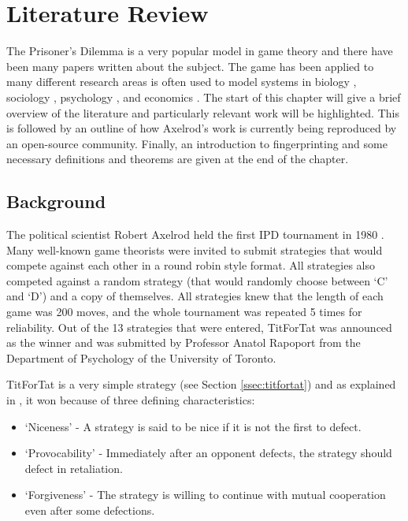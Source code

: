
\chapter{Literature Review}\label{cha:literature_review}

The Prisoner's Dilemma is a very popular model in game theory and there have been many papers written about the subject.
The game has been applied to many different research areas is often used to model systems in biology \cite{Sigmund1999}, sociology \cite{Franken2005}, psychology \cite{Ishibuchi2005}, and economics \cite{Chong2005}.
The start of this chapter will give a brief overview of the literature and particularly relevant work will be highlighted.
This is followed by an outline of how Axelrod's work is currently being reproduced by an open-source community.
Finally, an introduction to fingerprinting and some necessary definitions and theorems are given at the end of the chapter.


\section{Background}\label{sec:axelrodoriginal}

The political scientist Robert Axelrod held the first IPD tournament in 1980 \cite{Axelrod1980a}.
Many well-known game theorists were invited to submit strategies that would compete against each other in a round robin style format.
All strategies also competed against a random strategy (that would randomly choose between `C' and `D') and a copy of themselves.
All strategies knew that the length of each game was 200 moves, and the whole tournament was repeated 5 times for reliability.
Out of the 13 strategies that were entered, TitForTat was announced as the winner and was submitted by Professor Anatol Rapoport from the Department of Psychology of the University of Toronto.

TitForTat is a very simple strategy (see Section \ref{ssec:titfortat}) and as explained in \cite{Axelrod1980b}, it won because of three defining characteristics:

\begin{itemize}
    \item `Niceness' - A strategy is said to be nice if it is not the first to defect.
    \item `Provocability' - Immediately after an opponent defects, the strategy should defect in retaliation.
    \item `Forgiveness' - The strategy is willing to continue with mutual cooperation even after some defections.
\end{itemize}


